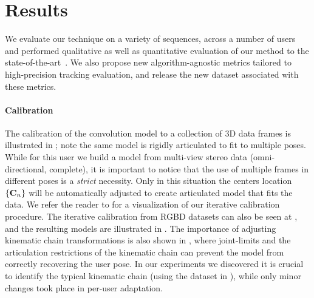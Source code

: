 \section{Results}
\label{sec:results}
We evaluate our technique on a variety of sequences, across a number of users and performed qualitative as well as quantitative evaluation of our method to the state-of-the-art~\cite{sridhar2015fast,tagliasacchi2015robust,sharp2015accurate,taylor2016concerto}. We also propose new algorithm-agnostic metrics tailored to high-precision tracking evaluation, and release the new \handy{} dataset associated with these metrics.

\paragraph{Calibration}
The calibration of the convolution model to a collection of 3D data frames is illustrated in ; note the same model is rigidly articulated to fit to multiple poses. While for this user we build a model from multi-view stereo data (omni-directional, complete), it is important to notice that the use of multiple frames in different poses is a \emph{strict} necessity. Only in this situation the centers location ${\{\mathbf{C}_n\}}$ will be automatically adjusted to create articulated model that  fits the data. We refer the reader to  for a visualization of our iterative calibration procedure. The iterative calibration from RGBD datasets can also be seen at , and the resulting models are illustrated in . The importance of adjusting kinematic chain transformations is also shown in , where joint-limits and the articulation restrictions of the kinematic chain can prevent the model from correctly recovering the user pose. In our experiments we discovered it is crucial to identify the typical kinematic chain (using the dataset in ), while only minor changes took place in per-user adaptation.

